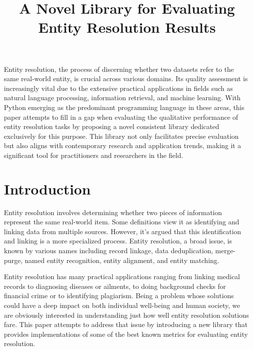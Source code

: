 \documentclass[a4paper,twoside]{article}
\begin{document}
    \theoremstyle{definition}
    \newtheorem{defn}{Definition}[section]
    
    \title{A Novel Library for Evaluating Entity Resolution Results}

    \abstract\label{abstract}

    Entity resolution, the process of discerning whether two datasets refer to
    the same real-world entity, is crucial across various domains.
    Its quality assessment is increasingly vital due to the extensive practical
    applications in fields such as natural language processing, information
    retrieval, and machine learning.
    With Python emerging as the predominant programming language in these areas,
    this paper attempts to fill in a gap when evaluating the qualitative
    performance of entity resolution tasks by proposing a novel consistent
    library dedicated exclusively for this purpose.
    This library not only facilitates precise evaluation but also aligns with
    contemporary research and application trends, making it a significant tool
    for practitioners and researchers in the field.


    \section{Introduction}\label{sec:introduction}
    Entity resolution involves determining whether two pieces of information
    represent the same real-world item.
    Some definitions view it as identifying and linking data from multiple
    sources\cite{Qia17}.
    However, it's argued that this identification and linking is a more
    specialized process\cite{Tal11}.
    Entity resolution, a broad issue, is known by various names including record
    linkage, data deduplication, merge-purge, named entity recognition, entity
    alignment, and entity matching.

    Entity resolution has many practical applications ranging from linking
    medical records to diagnosing diseases or ailments, to doing background
    checks for financial crime or to identifying plagiarism.
    Being a problem whose solutions could have a deep impact on both individual
    well-being and human society, we are obviously interested in understanding
    just how well entity resolution solutions fare.
    This paper attempts to address that issue by introducing a new library that
    provides implementations of some of the best known metrics for evaluating
    entity resolution\cite{matchescu-er-metrics2023}.
\end{document}
